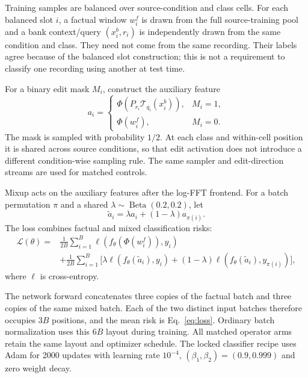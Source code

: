 Training samples are balanced over source-condition and class cells.
For each balanced slot $i$, a factual window $w_i^f$ is drawn from the full
source-training pool and a bank context/query $(x_i^b,r_i)$ is independently
drawn from the same condition and class. They need not come from the same
recording. Their labels agree because of the balanced slot construction;
this is not a requirement to classify one recording using another at test
time.

For a binary edit mask $M_i$, construct the auxiliary feature
\begin{equation}
 a_i =
 \begin{cases}
  \Phi(P_{r_i}\mathcal T_{q_i}(x_i^b)), & M_i=1,\\
  \Phi(w_i^f), & M_i=0 .
 \end{cases}
 \label{eq:aux}
\end{equation}
The mask is sampled with probability $1/2$. At each class and within-cell
position it is shared across source conditions, so that edit activation
does not introduce a different condition-wise sampling rule.
The same sampler and edit-direction streams are used for matched controls.

Mixup acts on the auxiliary features after the log-FFT frontend.
For a batch permutation $\pi$ and a shared
$\lambda\sim\operatorname{Beta}(0.2,0.2)$, let
\begin{equation}
 \widetilde a_i=\lambda a_i+(1-\lambda)a_{\pi(i)} .
 \label{eq:mix}
\end{equation}
The loss combines factual and mixed classification risks:
\begin{align}
 \mathcal L(\theta)
  ={}&\frac{1}{2B}\sum_{i=1}^{B}
       \ell(f_\theta(\Phi(w_i^f)),y_i)\nonumber\\
   &+\frac{1}{2B}\sum_{i=1}^{B}
       \big[\lambda\ell(f_\theta(\widetilde a_i),y_i)
       +(1-\lambda)\ell(f_\theta(\widetilde a_i),y_{\pi(i)})\big],
 \label{eq:loss}
\end{align}
where $\ell$ is cross-entropy.

The network forward concatenates three copies of the factual batch and
three copies of the same mixed batch. Each of the two distinct input
batches therefore occupies $3B$ positions, and the mean risk is
Eq.~\eqref{eq:loss}. Ordinary batch normalization uses this $6B$ layout
during training. All matched operator arms retain the same layout and optimizer schedule.
The locked classifier recipe uses Adam for 2000 updates with learning rate
$10^{-4}$, $(\beta_1,\beta_2)=(0.9,0.999)$ and zero weight decay.

